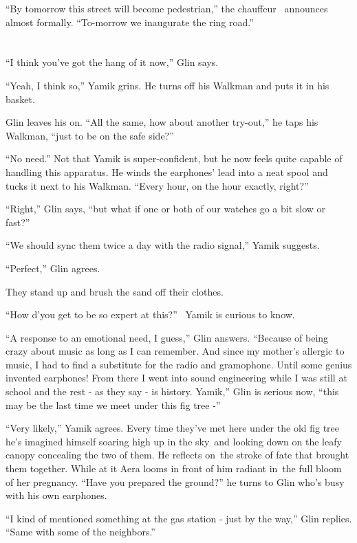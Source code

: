 \documentclass[twoside,11pt]{book}
\begin{document}
``By tomorrow this street will become pedestrian,'' the chauffeur \ announces almost formally.
``To-morrow we inaugurate the ring road.''


\bigskip

\chapter{}

``I think you've got the hang of it now,'' Glin says.

``Yeah, I think so,'' Yamik grins. He turns off his Walkman and puts it in his basket.

Glin leaves his on. ``All the same, how about another try-out,'' he taps his Walkman, ``just
to be on the safe side?''

``No need.'' Not that Yamik is super-confident, but he now feels quite capable of handling
this apparatus. He winds the earphones' lead into a neat spool and tucks it next to his Walkman. ``Every
hour, on the hour exactly, right?'' \

``Right,'' Glin says, ``but what if one or both of our watches go a bit slow or
fast?''

``We should sync them twice a day with the radio signal,'' Yamik suggests.

``Perfect,'' Glin agrees.

They stand up and brush the sand off their clothes.

``How d'you get to be so expert at this?'' \ Yamik is curious to know.

``A response to an emotional need, I guess,'' Glin answers. ``Because of being
crazy about music as long as I can remember. And since my mother's allergic to music, I had to find a substitute for
the radio and gramophone. Until some genius invented earphones! From there I went into sound engineering while I was
still at school and the rest - as they say - is history. Yamik,'' Glin is serious now, ``this
may be the last time we meet under this fig tree -''

``Very likely,'' Yamik agrees. Every time they've met here under the old fig tree he's
imagined himself soaring high up in the sky~and looking down on the leafy canopy concealing the two of them. He
reflects on~the stroke of fate that brought them together. While at it Aera looms in front of him radiant in~the full
bloom of her pregnancy. ``Have you prepared the ground?'' he turns to Glin who's busy with
his own earphones.

``I kind of mentioned something at the gas station - just by the way,'' Glin replies.
``Same with some of the neighbors.''
\end{document}
